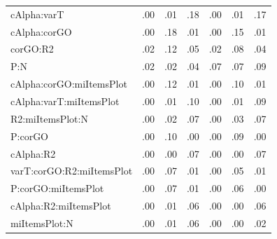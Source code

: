 \begin{table}[ht]
\begin{tabular}{lllllll}
  cAlpha:varT & .00 & .01 & .18 & .00 & .01 & .17 \\ 
  cAlpha:corGO & .00 & .18 & .01 & .00 & .15 & .01 \\ 
  corGO:R2 & .02 & .12 & .05 & .02 & .08 & .04 \\ 
  P:N & .02 & .02 & .04 & .07 & .07 & .09 \\ 
  cAlpha:corGO:miItemsPlot & .00 & .12 & .01 & .00 & .10 & .01 \\ 
  cAlpha:varT:miItemsPlot & .00 & .01 & .10 & .00 & .01 & .09 \\ 
  R2:miItemsPlot:N & .00 & .02 & .07 & .00 & .03 & .07 \\ 
  P:corGO & .00 & .10 & .00 & .00 & .09 & .00 \\ 
  cAlpha:R2 & .00 & .00 & .07 & .00 & .00 & .07 \\ 
  varT:corGO:R2:miItemsPlot & .00 & .07 & .01 & .00 & .05 & .01 \\ 
  P:corGO:miItemsPlot & .00 & .07 & .01 & .00 & .06 & .00 \\ 
  cAlpha:R2:miItemsPlot & .00 & .01 & .06 & .00 & .00 & .06 \\ 
  miItemsPlot:N & .00 & .01 & .06 & .00 & .00 & .02 \\ 
   \hline
\end{tabular}
\end{table}
